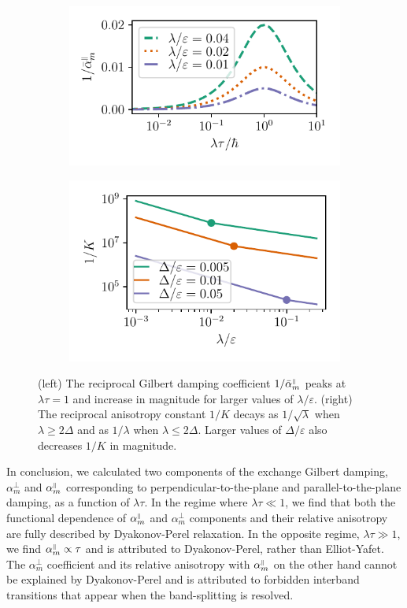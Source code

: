 \begin{figure}
\begin{subfigure}{.5\textwidth}
  \centering
  \includegraphics[width=.95\linewidth]{gfx/inverse_alpha.pdf}
\end{subfigure}%
\begin{subfigure}{.5\textwidth}
  \centering
  \includegraphics[width=.88\linewidth]{gfx/inverse_K.pdf}
\end{subfigure}
\caption{(left) The reciprocal Gilbert damping coefficient $1/\bar{\alpha}_m^{{\scriptscriptstyle\parallel}}$ peaks at $\lambda\tau=1$ and increase in magnitude for larger values of $\lambda/\varepsilon$. (right) The reciprocal anisotropy constant $1/K$ decays as $1/\sqrt{\lambda}$ when $\lambda\geq2\Delta$ and as $1/{\lambda}$ when $\lambda\leq2\Delta$. Larger values of $\Delta/\varepsilon$ also decreases $1/K$ in magnitude.}
\label{fig:max}
\end{figure}

In conclusion, we calculated two components of the exchange Gilbert damping, $\alpha_m^\perp$ and $\alpha_m^{\scriptscriptstyle\parallel}$ corresponding to perpendicular-to-the-plane and parallel-to-the-plane damping, as a function of $\lambda\tau$. In the regime where $\lambda\tau\ll1$, we find that both the functional dependence of $\alpha_m^{\scriptscriptstyle\parallel}$ and $\alpha_m^\perp$ components and their relative anisotropy are fully described by Dyakonov-Perel relaxation. In the opposite regime, $\lambda\tau\gg1$, we find $\alpha_m^{\scriptscriptstyle\parallel}\propto \tau$ and is attributed to Dyakonov-Perel, rather than Elliot-Yafet. The $\alpha_m^\perp$ coefficient and its relative anisotropy with $\alpha_m^{\scriptscriptstyle\parallel}$  on the other hand cannot be explained by Dyakonov-Perel and is attributed to forbidden interband transitions that appear when the band-splitting is resolved. 

